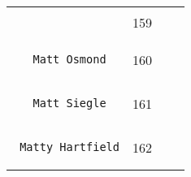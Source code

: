 \documentclass[]{article}
\begin{document}
\begin{longtable}[c]{@{}llll@{}}
\begin{minipage}[t]{0.39\columnwidth}
\begin{verbatim}
\end{verbatim}
\end{minipage} & \begin{minipage}[t]{0.10\columnwidth}\raggedright
159
\end{minipage} & \begin{minipage}[t]{0.13\columnwidth}\raggedright
\end{minipage} & \begin{minipage}[t]{0.15\columnwidth}\raggedright
\end{minipage}
\\\noalign{\medskip}
\begin{minipage}[t]{0.39\columnwidth}\raggedright
\begin{verbatim}
   Matt Osmond
\end{verbatim}
\end{minipage} & \begin{minipage}[t]{0.10\columnwidth}\raggedright
160
\end{minipage} & \begin{minipage}[t]{0.13\columnwidth}\raggedright
\end{minipage} & \begin{minipage}[t]{0.15\columnwidth}\raggedright
\end{minipage}
\\\noalign{\medskip}
\begin{minipage}[t]{0.39\columnwidth}\raggedright
\begin{verbatim}
   Matt Siegle
\end{verbatim}
\end{minipage} & \begin{minipage}[t]{0.10\columnwidth}\raggedright
161
\end{minipage} & \begin{minipage}[t]{0.13\columnwidth}\raggedright
\end{minipage} & \begin{minipage}[t]{0.15\columnwidth}\raggedright
\end{minipage}
\\\noalign{\medskip}
\begin{minipage}[t]{0.39\columnwidth}\raggedright
\begin{verbatim}
 Matty Hartfield
\end{verbatim}
\end{minipage} & \begin{minipage}[t]{0.10\columnwidth}\raggedright
162
\end{minipage} & \begin{minipage}[t]{0.13\columnwidth}\raggedright

\end{minipage}
\end{longtable}
\end{document}
